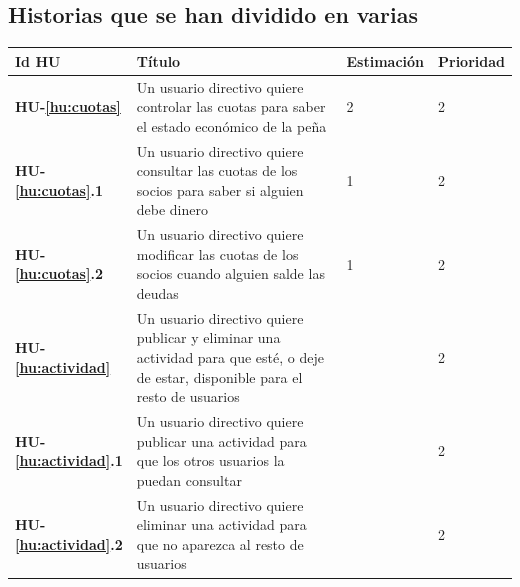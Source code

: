 \documentclass[11pt]{article}
\begin{document}
\subsection{Historias que se han dividido en varias}
\begin{table}[H]
  \centering
  \begin{tabular}{p{0.12\linewidth}p{0.6\linewidth}p{0.15\linewidth}p{0.15\linewidth}}
    \toprule
    \textbf{Id HU} & \textbf{Título} & \textbf{Estimación} & \textbf{Prioridad}\\
    \midrule
    \textbf{HU-\ref{hu:cuotas}} & Un usuario directivo quiere controlar las cuotas para saber el estado económico de la peña & 2 & 2\\
	\textbf{HU-\ref{hu:cuotas}.1} & Un usuario directivo quiere consultar las cuotas de los socios para saber si alguien debe dinero & 1 & 2\\
	\textbf{HU-\ref{hu:cuotas}.2} & Un usuario directivo quiere modificar las cuotas de los socios cuando alguien salde las deudas & 1 & 2\\
	
	\midrule
	\textbf{HU-\ref{hu:actividad}} & Un usuario directivo quiere publicar y eliminar una actividad para que esté, o deje de estar, disponible para el resto de usuarios & & 2\\
	\textbf{HU-\ref{hu:actividad}.1} & Un usuario directivo quiere publicar una actividad para que los otros usuarios la puedan consultar & & 2\\
	\textbf{HU-\ref{hu:actividad}.2} & Un usuario directivo quiere eliminar una actividad para que no aparezca al resto de usuarios & & 2\\
    \bottomrule
  \end{tabular}
  
\end{table}
\end{document}
